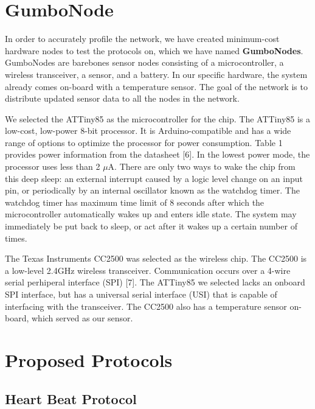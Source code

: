 \section{GumboNode}
\label{section:gumbo_node}

In order to accurately profile the network, we have created minimum-cost hardware nodes to test the protocols on, which we have named
\textbf{GumboNodes}.  GumboNodes are barebones sensor nodes consisting of a microcontroller, a wireless transceiver, a sensor, and a battery. In our specific hardware, the system already comes on-board with a temperature sensor.  The goal of the network is to distribute updated sensor data to all the nodes in the network.

We selected the ATTiny85 as the microcontroller for the chip. The ATTiny85 is a low-cost, low-power 8-bit processor. It is Arduino-compatible and has a wide range of options to optimize the processor for power consumption. Table 1 provides power information from the datasheet [6]. In the lowest power mode, the processor uses less than 2 $\mu$A. There are only two ways to wake the chip from this deep sleep: an external interrupt caused by a logic level change on an input pin, or periodically by an internal oscillator known as the watchdog timer. The watchdog timer has maximum time limit of 8 seconds after which the microcontroller automatically wakes up and enters idle state. The system may immediately be put back to sleep, or act after it wakes up a certain number of times.

The Texas Instruments CC2500 was selected as the wireless chip. The CC2500 is a low-level 2.4GHz wireless transceiver. Communication occurs over a 4-wire serial perhiperal interface (SPI) [7]. The ATTiny85 we selected lacks an onboard SPI interface, but has a universal serial interface (USI) that is capable of interfacing with the transceiver. The CC2500 also has a temperature sensor on-board, which served as our sensor. 


\section{Proposed Protocols}

\subsection{Heart Beat Protocol}
\label{section:heart_beat_protocol}

